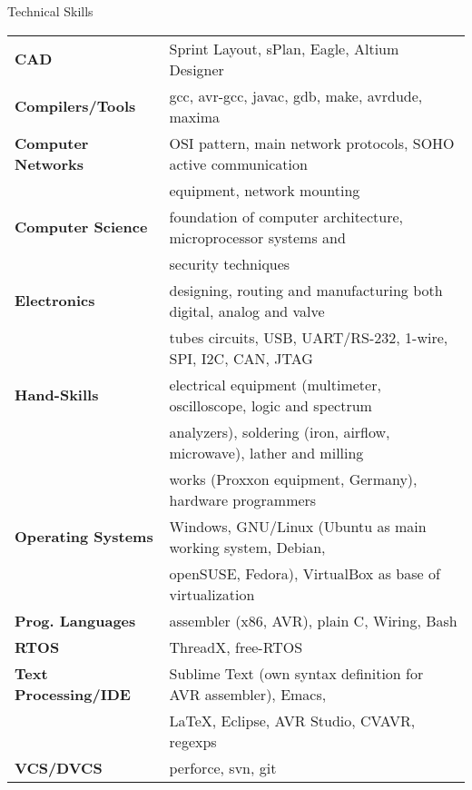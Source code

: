 \documentclass{resume}
\begin{document}
\begin{rSection}{Technical Skills}

\begin{tabular}{ @{} >{\bfseries}l @{\hspace{6ex}} l }
CAD                 & Sprint Layout, sPlan, Eagle, Altium Designer \\
Compilers/Tools     & gcc, avr-gcc, javac, gdb, make, avrdude, maxima \\
Computer Networks   & OSI pattern, main network protocols, SOHO active communication \\
                    & equipment, network mounting \\
Computer Science    & foundation of computer architecture, microprocessor systems and \\
                    & security techniques \\
Electronics         & designing, routing and manufacturing both digital, analog and valve \\
                    & tubes circuits, USB, UART/RS-232, 1-wire, SPI, I2C, CAN, JTAG \\
Hand-Skills         & electrical equipment (multimeter, oscilloscope, logic and spectrum \\
                    & analyzers), soldering (iron, airflow, microwave), lather and milling \\
                    & works (Proxxon equipment, Germany), hardware programmers \\
Operating Systems   & Windows, GNU/Linux (Ubuntu as main working system, Debian, \\
                    & openSUSE, Fedora), VirtualBox as base of virtualization \\
Prog. Languages     & assembler (x86, AVR), plain C, Wiring, Bash \\
RTOS                & ThreadX, free-RTOS \\
Text Processing/IDE & Sublime Text (own syntax definition for AVR assembler), Emacs, \\
                    & LaTeX, Eclipse, AVR Studio, CVAVR, regexps \\
VCS/DVCS            & perforce, svn, git
\end{tabular}

\end{rSection}

\end{document}
